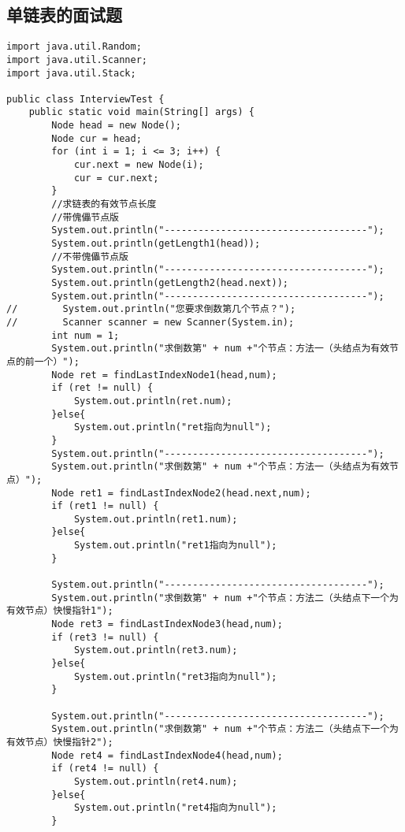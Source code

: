 \documentclass[a4paper]{report}
\begin{document}
\subsection{单链表的面试题}
\begin{lstlisting}
import java.util.Random;
import java.util.Scanner;
import java.util.Stack;

public class InterviewTest {
    public static void main(String[] args) {
        Node head = new Node();
        Node cur = head;
        for (int i = 1; i <= 3; i++) {
            cur.next = new Node(i);
            cur = cur.next;
        }
        //求链表的有效节点长度
        //带傀儡节点版
        System.out.println("------------------------------------");
        System.out.println(getLength1(head));
        //不带傀儡节点版
        System.out.println("------------------------------------");
        System.out.println(getLength2(head.next));
        System.out.println("------------------------------------");
//        System.out.println("您要求倒数第几个节点？");
//        Scanner scanner = new Scanner(System.in);
        int num = 1;
        System.out.println("求倒数第" + num +"个节点：方法一（头结点为有效节点的前一个）");
        Node ret = findLastIndexNode1(head,num);
        if (ret != null) {
            System.out.println(ret.num);
        }else{
            System.out.println("ret指向为null");
        }
        System.out.println("------------------------------------");
        System.out.println("求倒数第" + num +"个节点：方法一（头结点为有效节点）");
        Node ret1 = findLastIndexNode2(head.next,num);
        if (ret1 != null) {
            System.out.println(ret1.num);
        }else{
            System.out.println("ret1指向为null");
        }

        System.out.println("------------------------------------");
        System.out.println("求倒数第" + num +"个节点：方法二（头结点下一个为有效节点）快慢指针1");
        Node ret3 = findLastIndexNode3(head,num);
        if (ret3 != null) {
            System.out.println(ret3.num);
        }else{
            System.out.println("ret3指向为null");
        }

        System.out.println("------------------------------------");
        System.out.println("求倒数第" + num +"个节点：方法二（头结点下一个为有效节点）快慢指针2");
        Node ret4 = findLastIndexNode4(head,num);
        if (ret4 != null) {
            System.out.println(ret4.num);
        }else{
            System.out.println("ret4指向为null");
        }


\end{lstlisting}
\end{document}
